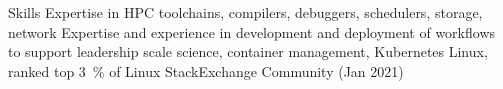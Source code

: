 \documentclass[11pt]{resume}
\begin{document}
\begin{category}{Skills}
\citembullet Expertise in HPC toolchains, compilers, debuggers, schedulers, storage, network
\citembullet Expertise and experience in development and deployment of workflows to support leadership scale science, container management, Kubernetes
\citembullet Linux, ranked top 3~\% of Linux StackExchange Community (Jan 2021)
\end{category}


\renewcommand\refname{Relevant Publications \& Presentations}

\nocite{*}
% 
\end{document}
